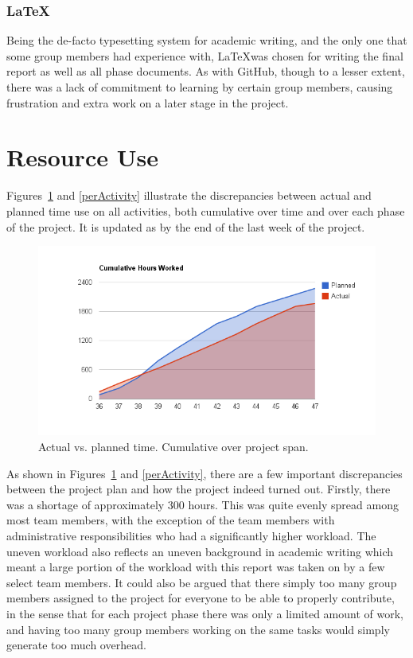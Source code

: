 \subsubsection{\LaTeX}
Being the de-facto typesetting system for academic writing, and the
only one that some group members had experience with, \LaTeX was
chosen for writing the final report as well as all phase documents. As
with GitHub, though to a lesser extent,  there was a lack of commitment to learning by certain
group members, causing frustration and extra work on a later stage
in the project.


\section{Resource Use}\label{resourceUse}

 Figures~\ref{actualPlannedCuml} and \ref{perActivity} illustrate
the discrepancies between actual and planned time use on all
activities, both cumulative over time and over each phase of the
project. It is updated as by the end of the last week of the project.

\begin{centering}
  \begin{figure}[h!]
    \includegraphics[width = \textwidth]{Evaluation/actual_v_planned_cuml}
    \caption{Actual vs. planned time. Cumulative over project span.}
    \label{actualPlannedCuml}
  \end{figure}
\end{centering}

As shown in Figures~\ref{actualPlannedCuml} and \ref{perActivity}, there
are a few important discrepancies between the project plan and how the
project indeed turned out. Firstly, there was a shortage of
approximately 300 hours. This was quite evenly spread among most team
members, with the exception of the team members with administrative
responsibilities who had a significantly higher workload. The uneven
workload also reflects an uneven background in academic writing which
meant a large portion of the workload with this report was taken on by
a few select team members. It could also be argued that there simply
too many group members assigned to the project for everyone to be able
to properly contribute, in the sense that for each project phase there
was only a limited amount of work, and having too many group members
working on the same tasks would simply generate too much overhead.

